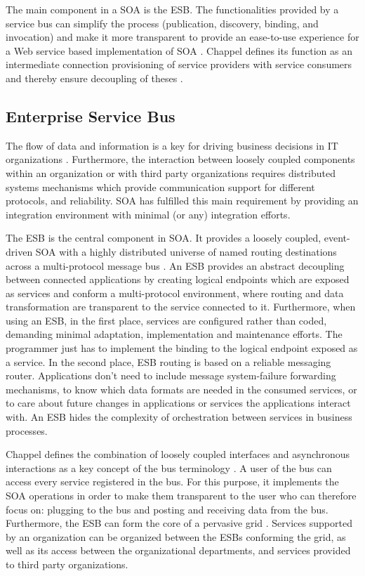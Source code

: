 The main component in a \ac{SOA} is the \ac{ESB}. The functionalities provided by a service bus can simplify the process (publication, discovery, binding, and invocation) and make it more transparent to provide an ease-to-use experience for a Web service based implementation of \ac{SOA} \cite{Weera2005}. Chappel defines its function as an intermediate connection provisioning of service providers with service consumers and thereby ensure decoupling of theses \cite{Chapp2004}. 

\subsection{Enterprise Service Bus}

The flow of data and information is a key for driving business decisions in IT organizations \cite{Chapp2004}. Furthermore, the interaction between loosely coupled components within an organization or with third party organizations requires distributed systems mechanisms which provide communication support for different protocols, and reliability. SOA has fulfilled this main requirement by providing an integration environment with minimal (or any) integration efforts. 

The \ac{ESB} is the central component in \ac{SOA}. It provides a loosely coupled, event-driven \ac{SOA} with a highly distributed universe of named routing destinations across a multi-protocol message bus \cite{Chapp2004}. An \ac{ESB} provides an abstract decoupling between connected applications by creating logical endpoints which are exposed as services and conform a multi-protocol environment, where routing and data transformation are transparent to the service connected to it. Furthermore, when using an \ac{ESB}, in the first place, services are configured rather than coded, demanding minimal adaptation, implementation and maintenance efforts. The programmer just has to implement the binding to the logical endpoint exposed as a service. In the second place, \ac{ESB} routing is based on a reliable messaging router. Applications don't need to include message system-failure forwarding mechanisms, to know which data formats are needed in the consumed services, or to care about future changes in applications or services the applications interact with. An \ac{ESB} hides the complexity of orchestration between services in business processes. 

Chappel defines the combination of loosely coupled interfaces and asynchronous interactions as a key concept of the bus terminology  \cite{Chapp2004}. A user of the bus can access every service registered in the bus. For this purpose, it implements the \ac{SOA} operations in order to make them transparent to the user who can therefore focus on: plugging to the bus and posting and receiving data from the bus. Furthermore, the \ac{ESB} can form the core of a pervasive grid \cite{Chapp2004}. Services supported by an organization can be organized between the \ac{ESB}s conforming the grid, as well as its access between the organizational departments, and services provided to third party organizations. 

